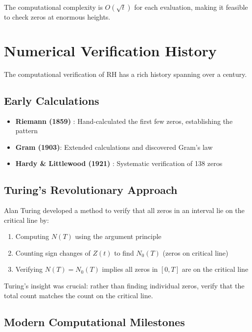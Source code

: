 The computational complexity is $O(\sqrt{t})$ for each evaluation, making it feasible to check zeros at enormous heights.

\section{Numerical Verification History}
\label{sec:verification-history}

The computational verification of RH has a rich history spanning over a century.

\subsection{Early Calculations}

\begin{itemize}
\item \textbf{Riemann (1859)} \cite{riemann1859}: Hand-calculated the first few zeros, establishing the pattern
\item \textbf{Gram (1903)}: Extended calculations and discovered Gram's law
\item \textbf{Hardy \& Littlewood (1921)} \cite{hardy1914}: Systematic verification of 138 zeros
\end{itemize}

\subsection{Turing's Revolutionary Approach}

\begin{theorem}
Alan Turing developed a method to verify that all zeros in an interval lie on the critical line by:
\begin{enumerate}
\item Computing $N(T)$ using the argument principle
\item Counting sign changes of $Z(t)$ to find $N_0(T)$ (zeros on critical line)
\item Verifying $N(T) = N_0(T)$ implies all zeros in $[0,T]$ are on the critical line
\end{enumerate}
\end{theorem}

Turing's insight was crucial: rather than finding individual zeros, verify that the total count matches the count on the critical line.

\subsection{Modern Computational Milestones}

